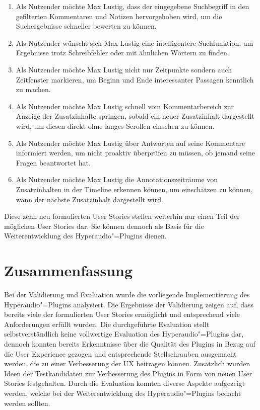 \begin{enumerate}[leftmargin=1.3cm,label=US-\arabic*:,ref=US-\arabic*]
\item Als Nutzender möchte Max Lustig, dass der eingegebene Suchbegriff in den gefilterten Kommentaren und Notizen hervorgehoben wird, um die Suchergebnisse schneller bewerten zu können.
\item Als Nutzender wünscht sich Max Lustig eine intelligentere Suchfunktion, um Ergebnisse trotz Schreibfehler oder mit ähnlichen Wörtern zu finden.
\item Als Nutzender möchte Max Lustig nicht nur Zeitpunkte sondern auch Zeitfenster markieren, um Beginn und Ende interessanter Passagen kenntlich zu machen.
\item Als Nutzender möchte Max Lustig schnell vom Kommentarbereich zur Anzeige der Zusatzinhalte springen, sobald ein neuer Zusatzinhalt dargestellt wird, um diesen direkt ohne langes Scrollen einsehen zu können.
\item Als Nutzender möchte Max Lustig über Antworten auf seine Kommentare informiert werden, um nicht proaktiv überprüfen zu müssen, ob jemand seine Fragen beantwortet hat.
\item Als Nutzender möchte Max Lustig die Annotationszeiträume von Zusatzinhalten in der Timeline erkennen können, um einschätzen zu können, wann der nächste Zusatzinhalt dargestellt wird.
\end{enumerate}

Diese zehn neu formulierten User Stories stellen weiterhin nur einen Teil der möglichen User Stories dar. Sie können dennoch als Basis für die Weiterentwicklung des Hyperaudio"=Plugins dienen.

\section{Zusammenfassung}
Bei der Validierung und Evaluation wurde die vorliegende Implementierung des Hyperaudio"=Plugins analysiert. Die Ergebnisse der Validierung zeigen auf, dass bereits viele der formulierten User Stories ermöglicht und entsprechend viele Anforderungen erfüllt wurden. Die durchgeführte Evaluation stellt selbstverständlich keine vollwertige Evaluation des Hyperaudio"=Plugins dar, dennoch konnten bereits Erkenntnisse über die Qualität des Plugins in Bezug auf die User Experience gezogen und entsprechende Stellschrauben ausgemacht werden, die zu einer Verbesserung der UX beitragen können. Zusätzlich wurden Ideen der Testkandidaten zur Verbesserung des Plugins in Form von neuen User Stories festgehalten. Durch die Evaluation konnten diverse Aspekte aufgezeigt werden, welche bei der Weiterentwicklung des Hyperaudio"=Plugins bedacht werden sollten.


